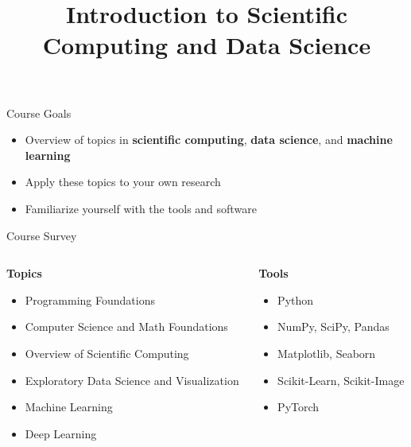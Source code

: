 \documentclass[]{beamer}
\title{Introduction to Scientific Computing and Data Science}
\date{}
\begin{document}
\begin{frame}
    \titlepage
\end{frame}


\begin{frame}{Course Goals}

    \begin{itemize}
        \item Overview of topics in \textbf{scientific computing}, \textbf{data science}, and \textbf{machine learning}
        \item Apply these topics to your own research
        \item Familiarize yourself with the tools and software
    \end{itemize}
\end{frame}

\begin{frame}{Course Survey}

    \begin{columns}[t]
        \begin{column}{0.5\textwidth}
            \textbf{Topics}
            \begin{itemize}
                \item Programming Foundations
                \item Computer Science and Math Foundations
                \item Overview of Scientific Computing
                \item Exploratory Data Science and Visualization
                \item Machine Learning
                \item Deep Learning
            \end{itemize}
        \end{column}
        \begin{column}{0.5\textwidth}
            \textbf{Tools}
            \begin{itemize}
                \item Python
                \item NumPy, SciPy, Pandas
                \item Matplotlib, Seaborn
                \item Scikit-Learn, Scikit-Image
                \item PyTorch
            \end{itemize}
        \end{column}
    \end{columns}

\end{frame}
\end{document}
